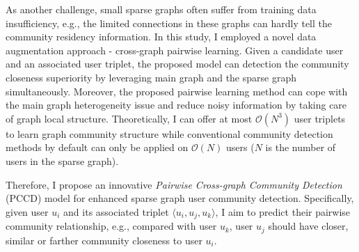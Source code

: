 As another challenge, small sparse graphs often suffer from training data insufficiency, e.g., the limited connections in these graphs can hardly tell the community residency information. In this study, I employed a novel data augmentation approach - cross-graph pairwise learning. Given a candidate user and an associated user triplet, the proposed model can detection the community closeness superiority by leveraging main graph and the sparse graph simultaneously. Moreover, the proposed pairwise learning method can cope with the main graph heterogeneity issue and reduce noisy information by taking care of graph local structure. Theoretically, I can offer at most $\mathcal{O}(N^{3})$ user triplets to learn graph community structure while conventional community detection methods by default can only be applied on $\mathcal{O}(N)$ users  ($N$ is the number of users in the sparse graph).

Therefore, I propose an innovative \textit{Pairwise Cross-graph Community Detection} (PCCD) model for enhanced sparse graph user community detection. Specifically, given user $u_i$ and its associated triplet $\langle u_{i},u_{j},u_{k}\rangle$, I aim to predict their pairwise community relationship, e.g., compared with user $u_{k}$, user $u_{j}$ should have closer, similar or farther community closeness to user $u_i$. 
